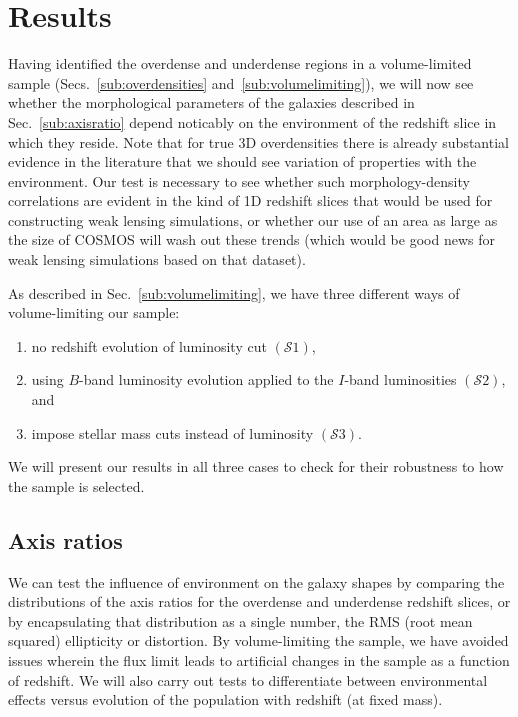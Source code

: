 \documentclass[twocolumn,useAMS,usenatbib]{mn2e}
\newcommand{\s}{\ensuremath{\mathcal{S}}}
\begin{document}
\section{Results}
\label{S:results}

Having identified the overdense and underdense regions in a
volume-limited sample (Secs.~\ref{sub:overdensities}
and~\ref{sub:volumelimiting}), we will now see whether the morphological
parameters of the galaxies described in Sec.~\ref{sub:axisratio}
depend noticably on the environment of the redshift slice in which
they reside. Note that for true 3D overdensities there is already
substantial evidence in the literature that we should see variation of
properties with the environment.  Our test is necessary to see
whether such morphology-density correlations are evident in the kind
of 1D redshift slices that would be used for constructing weak lensing
simulations, or whether our use of an area as large as the size of COSMOS will
wash out these trends (which would be good news for weak lensing
simulations based on that dataset).

As described in Sec.~\ref{sub:volumelimiting}, we have three different ways of volume-limiting our sample:
\begin{enumerate}
 \item no redshift evolution of luminosity cut $(\s1)$,
 \item using $B$-band luminosity evolution applied to the $I$-band
   luminosities $(\s2)$, and
 \item impose stellar mass cuts instead of luminosity $(\s3)$.
\end{enumerate}

We will present our results in all three cases to check for their
robustness to how the sample is selected. 

\subsection{Axis ratios} 

We can test the influence of environment on the galaxy shapes by
comparing the distributions of the axis ratios for the overdense and
underdense redshift slices, or by encapsulating that distribution as a
single number, the RMS (root mean squared) ellipticity or distortion. By
volume-limiting the sample, we have avoided issues
wherein the flux limit leads to artificial changes in the sample as a
function of redshift.  We will also carry out tests to differentiate
between environmental effects versus evolution of the population with
redshift (at fixed mass).
\end{document}

